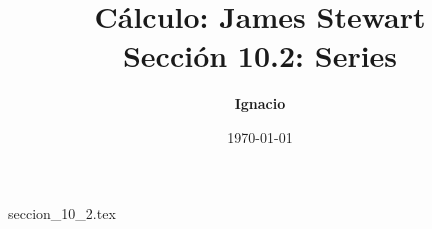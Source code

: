 \documentclass[11pt,spanish,oneside]{report}
\title{\textbf{Cálculo: James Stewart} \\ \Large Sección 10.2: Series}
\author{\textbf{Ignacio}}
\date{\today}
\begin{document}
\maketitle

{seccion_10_2.tex}
\end{document}
